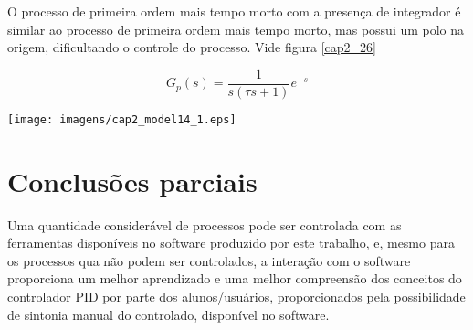     O processo de primeira ordem mais tempo morto com a presença de integrador é
    similar ao processo de primeira ordem mais tempo morto, mas possui um polo
    na origem, dificultando o controle do processo. Vide figura \ref{cap2_26}
    
    \begin{equation}
        G_p(s) = \frac{1}{s(\tau s + 1)}e^{-s}
    \end{equation}
    
    \begin{center}
        \texttt{[image: imagens/cap2\_model14\_1.eps]}
        \label{cap2_26}
    \end{center}

\section{Conclusões parciais}

    Uma quantidade considerável de processos pode ser controlada com as ferramentas
    disponíveis no software produzido por este trabalho, e, mesmo para os processos
    qua não podem ser controlados, a interação com o software proporciona um melhor
    aprendizado e uma melhor compreensão dos conceitos do controlador \ac{PID}
    por parte dos alunos/usuários, proporcionados pela possibilidade de sintonia
    manual do controlado, disponível no software.
